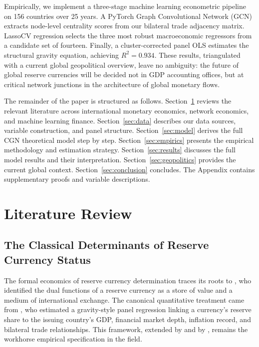 \documentclass[12pt, letterpaper]{article}
\theoremstyle{definition}
\begin{document}
Empirically, we implement a three-stage machine learning econometric pipeline on 156 countries over 25 years. A PyTorch Graph Convolutional Network (GCN) extracts node-level centrality scores from our bilateral trade adjacency matrix. LassoCV regression selects the three most robust macroeconomic regressors from a candidate set of fourteen. Finally, a cluster-corrected panel OLS estimates the structural gravity equation, achieving $R^2 = 0.934$. These results, triangulated with a current global geopolitical overview, leave no ambiguity: the future of global reserve currencies will be decided not in GDP accounting offices, but at critical network junctions in the architecture of global monetary flows.

The remainder of the paper is structured as follows. Section~\ref{sec:litreview} reviews the relevant literature across international monetary economics, network economics, and machine learning finance. Section~\ref{sec:data} describes our data sources, variable construction, and panel structure. Section~\ref{sec:model} derives the full CGN theoretical model step by step. Section~\ref{sec:empirics} presents the empirical methodology and estimation strategy. Section~\ref{sec:results} discusses the full model results and their interpretation. Section~\ref{sec:geopolitics} provides the current global context. Section~\ref{sec:conclusion} concludes. The Appendix contains supplementary proofs and variable descriptions.

\newpage

\section{Literature Review}
\label{sec:litreview}

\subsection{The Classical Determinants of Reserve Currency Status}

The formal economics of reserve currency determination traces its roots to \citet{kenen1983use}, who identified the dual functions of a reserve currency as a store of value and a medium of international exchange. The canonical quantitative treatment came from \citet{chinn2005euro}, who estimated a gravity-style panel regression linking a currency's reserve share to the issuing country's GDP, financial market depth, inflation record, and bilateral trade relationships. This framework, extended by \citet{frankel2012internationalization} and by \citet{eichengreen2019dollar}, remains the workhorse empirical specification in the field.
\end{document}
